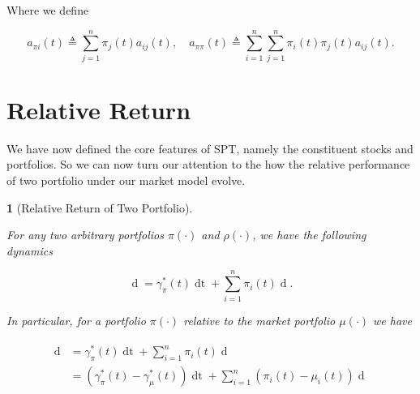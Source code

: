 \documentclass[british]{amsart} \usepackage{lmodern}
\numberwithin{equation}{section} \numberwithin{figure}{section}
\theoremstyle{plain} \newtheorem{thm}{\protect\theoremname}[section]
\theoremstyle{definition} \newtheorem{defn}[thm]{\protect\definitionname}
\theoremstyle{plain} \newtheorem{assumption}[thm]{\protect\assumptionname}
\theoremstyle{plain} \newtheorem{lem}[thm]{\protect\lemmaname}
\theoremstyle{plain} \newtheorem{prop}[thm]{\protect\propositionname}
\theoremstyle{remark} \newtheorem{rem}[thm]{\protect\remarkname}
\theoremstyle{plain} \newtheorem{cor}[thm]{\protect\corollaryname}
\renewcommand{\d}[1]{\mathop{\mathrm{d}{#1}}}
\newcommand{\defeq}{\mathop{\triangleq}} \newcommand{\almostsurely}{\text{a.s.}}
\begin{document}
Where we define

  \begin{equation}
      a_{\pi i}(t) \defeq \sum_{j=1}^{n} \pi_{j}(t)a_{ij}(t), \quad 
      a_{\pi \pi}(t) \defeq \sum_{i=1}^{n} \sum_{j=1}^{n} \pi_{i}(t) \pi_{j}(t) a_{ij}(t).
  \end{equation}

\newpage
\section{Relative Return}

We have now defined the core features of SPT, namely the constituent stocks and
portfolios. So we can now turn our attention to the how the relative performance of
two portfolio under our market model evolve.

\begin{lem} [Relative Return of Two Portfolio]
  \label{lem:relativereturnoftwoportfolios}

  For any two arbitrary portfolios $\pi(\cdot)$ and $\rho(\cdot)$, we have the
  following dynamics

  \begin{equation}    
    \label{eq:rrdynamics} 
      \d{\log{ \left( \frac{ V^{\pi}(t) }{V^{\rho}(t) } \right) } } = 
        \gamma_{\pi}^{*}(t)\d{t} + 
         \sum_{i=1}^{n} \pi_{i}(t) 
            \d{\log{ \left( \frac{ X_{i}(t) }{ V^{\rho}(t)} \right) }}. 
  \end{equation}

  In particular, for a portfolio $\pi(\cdot)$ relative to the market portfolio
  $\mu(\cdot)$ we have

  \begin{gather} 
    \label{eq:rrdynamics2} 
    \begin{split} 
      \d{ \log{ \left( \frac{V^{\pi}(t) }{ V^{\mu}(t) } \right) } } 
      &= \gamma_{\pi}^{*}(t)\d{t} + 
            \sum_{i=1}^{n} \pi_{i}(t)  \d{ \log{\mu_{i}(t)} } \\ 
      &= (\gamma_{\pi}^{*}(t) - \gamma_{\mu}^{*}(t)) \d{t} +
            \sum_{i=1}^{n} (\pi_{i}(t) - \mu_{i}(t)) \d{\log{\mu_{i}(t)} } \\ 
    \end{split} 
  \end{gather}

\end{lem}
\end{document}
